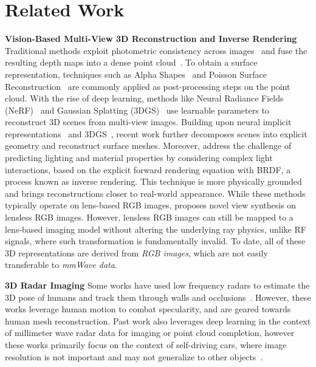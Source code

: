 \section{Related Work}
\label{sec:related}
\noindent\textbf{Vision-Based Multi-View 3D Reconstruction and Inverse Rendering}
Traditional methods exploit photometric consistency across images~\cite{furukawa2009accurate} and fuse the resulting depth maps into a dense point cloud~\cite{furukawa2015multi, yu2020fast, yao2018mvsnet}. 
To obtain a surface representation, techniques such as Alpha Shapes~\cite{edelsbrunner1983shape} and Poisson Surface Reconstruction~\cite{kazhdan2006poisson} are commonly applied as post-processing steps on the point cloud.
With the rise of deep learning, methods like Neural Radiance Fields (NeRF)~\cite{mildenhall2021nerf} and Gaussian Splatting (3DGS)~\cite{kerbl20233d} use learnable parameters to reconstruct 3D scenes from multi-view images. 
Building upon neural implicit representations~\cite{niemeyer2020differentiable, yariv2020multiview, yariv2021volume, wang2021neus} and 3DGS~\cite{huang20242d, jiang2024gaussianshader, liang2024gs, gao2024relightable, chen2023neusg}, recent work further decomposes scenes into explicit geometry and reconstruct surface meshes.
Moreover, \cite{srinivasan2021nerv, boss2021nerd, munkberg2022extracting, yao2022neilf, jin2023tensoir, liu2023nero, gu2025irgs, yao2025reflective} address the challenge of predicting lighting and material properties by considering complex light interactions, based on the explicit forward rendering equation with BRDF, a process known as inverse rendering. 
This technique is more physically grounded and brings reconstructions closer to real-world appearance.
While these methods typically operate on lens-based RGB images, \cite{madavan2025ganesh} proposes novel view synthesis on lensless RGB images. 
However, lensless RGB images can still be mapped to a lens-based imaging model without altering the underlying ray physics, unlike RF signals, where such transformation is fundamentally invalid.
To date, all of these 3D representations are derived from \textit{RGB images}, which are not easily transferable to \textit{mmWave data}.

\noindent\textbf{3D Radar Imaging}
Some works have used low
frequency radars to estimate the 3D
pose of humans and track them through walls and occlusions~\cite{adib2013see, adib2015capturing, zhao2018through, korany2019xmodal}. However, these works leverage human motion to combat specularity, and are geared towards human mesh reconstruction.
Past work also leverages deep learning in the context of
millimeter wave radar data for imaging or point cloud completion, however these works primarily focus on the context of self-driving cars, where image resolution is not important and may not generalize to other objects~\cite{guan2020through, sun20213drimr, lai2024enabling, sun20223d, sun2022r2p}.

